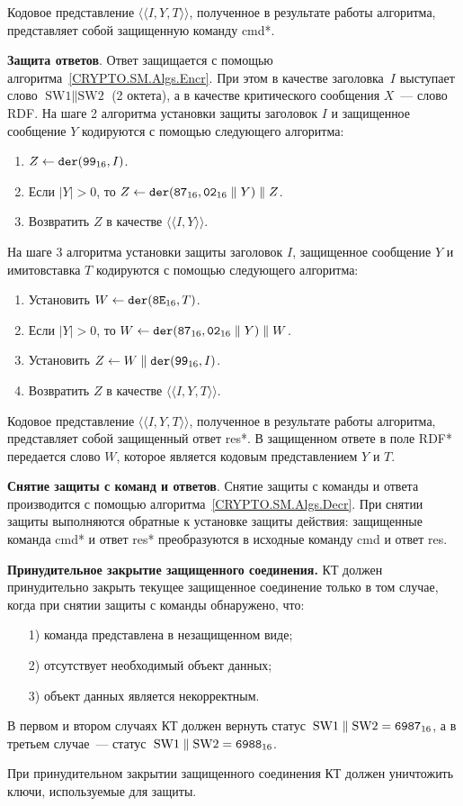 Кодовое представление $\langle\langle I, Y, T \rangle\rangle$, полученное 
в результате работы алгоритма, представляет собой защищенную команду cmd*. 

{\bf Защита ответов}. 
Ответ защищается с помощью алгоритма~\ref{CRYPTO.SM.Algs.Encr}. При этом в 
качестве заголовка~$I$ выступает слово $\text{SW1} \parallel\text{SW2}$ 
(2 октета), а в качестве критического сообщения $X$~--- слово RDF. 
На шаге 2 алгоритма установки защиты заголовок $I$ и защищенное сообщение $Y$ 
кодируются с помощью следующего алгоритма: 

\begin{enumerate}
\item
$Z\gets \texttt{der}(\texttt{99}_{16}, I)$.
\item
Если $|Y| > 0$,  то $Z\gets \texttt{der}(\texttt{87}_{16}, \texttt{02}_{16} \parallel Y) \parallel Z$. 
\item
Возвратить $Z$ в качестве $\langle\langle I, Y \rangle\rangle$.
\end{enumerate}

На шаге 3 алгоритма установки защиты заголовок $I$, защищенное сообщение $Y$ и 
имитовставка $T$ кодируются с помощью следующего алгоритма: 

\begin{enumerate}
\item 
Установить $W\gets\texttt{der}(\texttt{8E}_{16}, T)$.
\item 
Если $|Y| > 0$, 
то $W \gets \texttt{der}(\texttt{87}_{16}, \texttt{02}_{16}\parallel Y) \parallel W$.
\item
Установить $Z \gets W \parallel \texttt{der}(\texttt{99}_{16}, I)$.
\item
Возвратить $Z$ в качестве $\langle \langle I, Y, T\rangle\rangle$.
\end{enumerate}

Кодовое представление  $\langle\langle I, Y, T \rangle\rangle$, 
полученное в результате работы алгоритма, 
представляет собой защищенный ответ res*. 
В защищенном ответе в поле RDF* передается слово $W$, 
которое является кодовым представлением $Y$ и $T$. 

{\bf Снятие защиты с команд и ответов}. 
%
Снятие защиты с команды и ответа производится с помощью 
алгоритма~\ref{CRYPTO.SM.Algs.Decr}.  
При снятии защиты выполняются обратные к установке защиты действия: 
защищенные команда cmd* и ответ res* преобразуются в исходные команду cmd  
и ответ res.  

{\bf Принудительное закрытие защищенного соединения.}
%
КТ должен принудительно закрыть текущее защищенное соединение только в том случае, 
когда при снятии защиты с команды обнаружено, что: 
\begin{enumerate}
\item[1)] команда представлена в незащищенном виде;
\item[2)] отсутствует необходимый объект данных;
\item[3)] объект данных является некорректным.
\end{enumerate}

В первом и втором случаях КТ должен вернуть 
статус~$\text{SW1} \parallel \text{SW2} = \texttt{6987}_{16}$, 
а в третьем случае~--- статус~$\text{SW1} \parallel \text{SW2} = 
\texttt{6988}_{16}$.  

При принудительном закрытии защищенного соединения КТ должен уничтожить 
ключи, используемые для защиты. 
